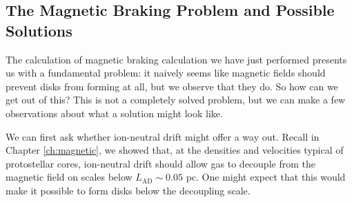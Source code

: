 \subsection{The Magnetic Braking Problem and Possible Solutions}

The calculation of magnetic braking calculation we have just performed presents us with a fundamental problem: it naively seems like magnetic fields should prevent disks from forming at all, but we observe that they do. So how can we get out of this? This is not a completely solved problem, but we can make a few observations about what a solution might look like.

We can first ask whether ion-neutral drift might offer a way out. Recall in Chapter \ref{ch:magnetic}, we showed that, at the densities and velocities typical of protostellar cores, ion-neutral drift should allow gas to decouple from the magnetic field on scales below $L_{\mathrm{AD}} \sim 0.05$ pc. One might expect that this would make it possible to form disks below the decoupling scale.

